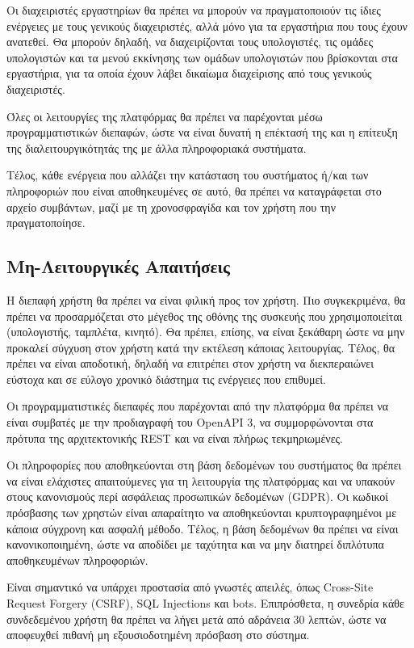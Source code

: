 Οι διαχειριστές εργαστηρίων θα πρέπει να μπορούν να πραγματοποιούν τις ίδιες ενέργειες με τους γενικούς διαχειριστές, αλλά μόνο για τα εργαστήρια που τους έχουν ανατεθεί. Θα μπορούν δηλαδή, να διαχειρίζονται τους υπολογιστές, τις ομάδες υπολογιστών και τα μενού εκκίνησης των ομάδων υπολογιστών που βρίσκονται στα εργαστήρια, για τα οποία έχουν λάβει δικαίωμα διαχείρισης από τους γενικούς διαχειριστές.

Όλες οι λειτουργίες της πλατφόρμας θα πρέπει να παρέχονται μέσω προγραμματιστικών διεπαφών, ώστε να είναι δυνατή η επέκτασή της και η επίτευξη της διαλειτουργικότητάς της με άλλα πληροφοριακά συστήματα.

Τέλος, κάθε ενέργεια που αλλάζει την κατάσταση του συστήματος ή/και των πληροφοριών που είναι αποθηκευμένες σε αυτό, θα πρέπει να καταγράφεται στο αρχείο συμβάντων, μαζί με τη χρονοσφραγίδα και τον χρήστη που την πραγματοποίησε.

\subsection{Μη-Λειτουργικές Απαιτήσεις}
Η διεπαφή χρήστη θα πρέπει να είναι φιλική προς τον χρήστη. Πιο συγκεκριμένα, θα πρέπει να προσαρμόζεται στο μέγεθος της οθόνης της συσκευής που χρησιμοποιείται (υπολογιστής, ταμπλέτα, κινητό). Θα πρέπει, επίσης, να είναι ξεκάθαρη ώστε να μην προκαλεί σύγχυση στον χρήστη κατά την εκτέλεση κάποιας λειτουργίας. Τέλος, θα πρέπει να είναι αποδοτική, δηλαδή να επιτρέπει στον χρήστη να διεκπεραιώνει εύστοχα και σε εύλογο χρονικό διάστημα τις ενέργειες που επιθυμεί.

Οι προγραμματιστικές διεπαφές που παρέχονται από την πλατφόρμα θα πρέπει να είναι συμβατές με την προδιαγραφή του OpenAPI 3, να συμμορφώνονται στα πρότυπα της αρχιτεκτονικής REST και να είναι πλήρως τεκμηριωμένες.

Οι πληροφορίες που αποθηκεύονται στη βάση δεδομένων του συστήματος θα πρέπει να είναι ελάχιστες απαιτούμενες για τη λειτουργία της πλατφόρμας και να υπακούν στους κανονισμούς περί ασφάλειας προσωπικών δεδομένων (GDPR). Οι κωδικοί πρόσβασης των χρηστών είναι απαραίτητο να αποθηκεύονται κρυπτογραφημένοι με κάποια σύγχρονη και ασφαλή μέθοδο. Τέλος, η βάση δεδομένων θα πρέπει να είναι κανονικοποιημένη, ώστε να αποδίδει με ταχύτητα και να μην διατηρεί διπλότυπα αποθηκευμένων πληροφοριών.

Είναι σημαντικό να υπάρχει προστασία από γνωστές απειλές, όπως Cross-Site Request Forgery (CSRF), SQL Injections και bots. Επιπρόσθετα, η συνεδρία κάθε συνδεδεμένου χρήστη θα πρέπει να λήγει μετά από αδράνεια 30 λεπτών, ώστε να αποφευχθεί πιθανή μη εξουσιοδοτημένη πρόσβαση στο σύστημα.

